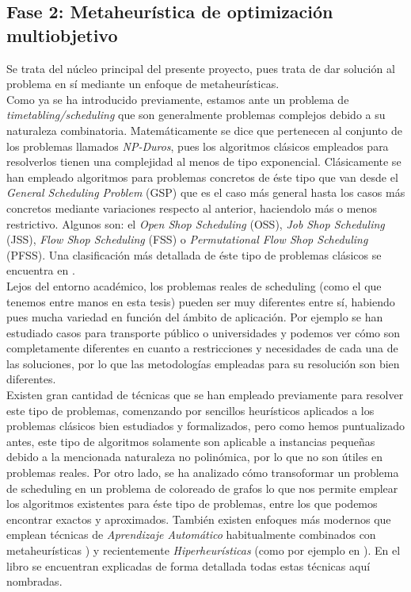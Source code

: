 \subsection{Fase 2: Metaheurística de optimización multiobjetivo} \label{sec:3:metaheurística}
Se trata del núcleo principal del presente proyecto, pues trata de dar solución al problema en sí mediante un enfoque de metaheurísticas.
\\

Como ya se ha introducido previamente, estamos ante un problema de \textit{timetabling/scheduling} que son generalmente problemas complejos debido a su naturaleza combinatoria. 
Matemáticamente se dice que pertenecen al conjunto de los problemas llamados \textit{NP-Duros}, pues los algoritmos clásicos empleados para resolverlos tienen una complejidad al menos de tipo exponencial.
Clásicamente se han empleado algoritmos para problemas concretos de éste tipo que van desde el \textit{General Scheduling Problem} (GSP) que es el caso más general hasta los casos más concretos mediante variaciones respecto al anterior, haciendolo más o menos restrictivo. 
Algunos son: el \textit{Open Shop Scheduling} (OSS), \textit{Job Shop Scheduling} (JSS), \textit{Flow Shop Scheduling} (FSS) o \textit{Permutational Flow Shop Scheduling} (PFSS). Una clasificación más detallada de éste tipo de problemas clásicos se encuentra en \cite{sota:tesis-doctoral}. 
\\

Lejos del entorno académico, los problemas reales de scheduling (como el que tenemos entre manos en esta tesis) pueden ser muy diferentes entre sí, habiendo pues mucha variedad en función del ámbito de aplicación. 
Por ejemplo se han estudiado casos para transporte público \cite{sota:transporte-publico} o universidades \cite{sota:universidad} y podemos ver cómo son completamente diferentes en cuanto a restricciones y necesidades de cada una de las soluciones, por lo que las metodologías empleadas para su resolución son bien diferentes.
\\

Existen gran cantidad de técnicas que se han empleado previamente para resolver este tipo de problemas, comenzando por sencillos heurísticos aplicados a los problemas clásicos bien estudiados y formalizados, pero como hemos puntualizado antes, este tipo de algoritmos solamente son aplicable a instancias pequeñas debido a la mencionada naturaleza no polinómica, por lo que no son útiles en problemas reales. Por otro lado, se ha analizado cómo transoformar un problema de scheduling en un problema de coloreado de grafos \cite{sota:estudio-coloreado-grafos, sota:algotimo-coloreado-grafos} lo que nos permite emplear los algoritmos existentes para éste tipo de problemas, entre los que podemos encontrar exactos y aproximados. También existen enfoques más modernos que emplean técnicas de \textit{Aprendizaje Automático} habitualmente combinados con metaheurísticas \cite{sota:machine-learning-geneticos}) y recientemente \textit{Hiperheurísticas} (como por ejemplo en \cite{sota:hiperheuristicas}). En el libro \cite{sota:libro-sota-scheduling} se encuentran explicadas de forma detallada todas estas técnicas aquí nombradas.
\\

